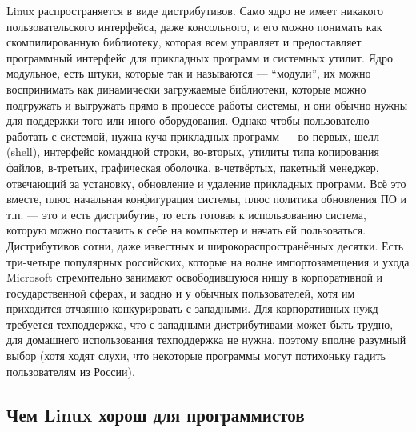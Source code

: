 \documentclass{../../text-style}
\begin{document}
Linux распространяется в виде дистрибутивов.
Само ядро не имеет никакого пользовательского интерфейса, даже консольного, и его можно понимать как скомпилированную библиотеку, которая всем управляет и предоставляет программный интерфейс для прикладных программ и системных утилит.
Ядро модульное, есть штуки, которые так и называются --- \enquote{модули}, их можно воспринимать как динамически загружаемые библиотеки, которые можно подгружать и выгружать прямо в процессе работы системы, и они обычно нужны для поддержки того или иного оборудования.
Однако чтобы пользователю работать с системой, нужна куча прикладных программ --- во-первых, шелл (shell), интерфейс командной строки, во-вторых, утилиты типа копирования файлов, в-третьих, графическая оболочка, в-четвёртых, пакетный менеджер, отвечающий за установку, обновление и удаление прикладных программ.
Всё это вместе, плюс начальная конфигурация системы, плюс политика обновления ПО и т.п. --- это и есть дистрибутив, то есть готовая к использованию система, которую можно поставить к себе на компьютер и начать ей пользоваться.
Дистрибутивов сотни, даже известных и широкораспространённых десятки.
Есть три-четыре популярных российских, которые на волне импортозамещения и ухода Microsoft стремительно занимают освободившуюся нишу в корпоративной и государственной сферах, и заодно и у обычных пользователей, хотя им приходится отчаянно конкурировать с западными.
Для корпоративных нужд требуется техподдержка, что с западными дистрибутивами может быть трудно, для домашнего использования техподдержка не нужна, поэтому вполне разумный выбор (хотя ходят слухи, что некоторые программы могут потихоньку гадить пользователям из России).

\subsection{Чем Linux хорош для программистов}
\end{document}

